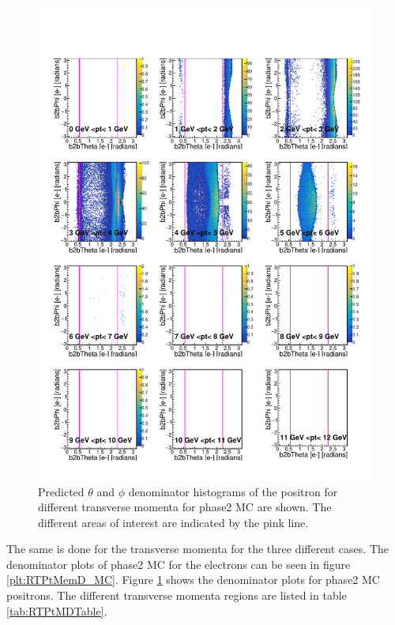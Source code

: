 \documentclass[a4paper,11pt,twosided,final,german,openbib,pdftex,listof=totoc,bibliography=totoc]{scrbook}
\begin{document}
\begin{figure}[h!]
	\includegraphics[width=\textwidth]{Plots/master/RTPtMepD_MC.pdf}
	\caption[Denominator $\theta$-$\phi$ Positron Transverse Momentum MC]{Predicted $\theta$ and $\phi$ denominator histograms of the positron for different transverse momenta for phase2 MC are shown. The different areas of interest are indicated by the pink line.
}
	\label{plt:RTPtMepD_MC}
\end{figure}


The same is done for the transverse momenta for the three different cases. The denominator plots of phase2 MC for the electrons can be seen in figure \ref{plt:RTPtMemD_MC}. Figure \ref{plt:RTPtMepD_MC} shows the denominator plots for phase2 MC positrons. The different transverse momenta regions are listed in table \ref{tab:RTPtMDTable}.
\end{document}
